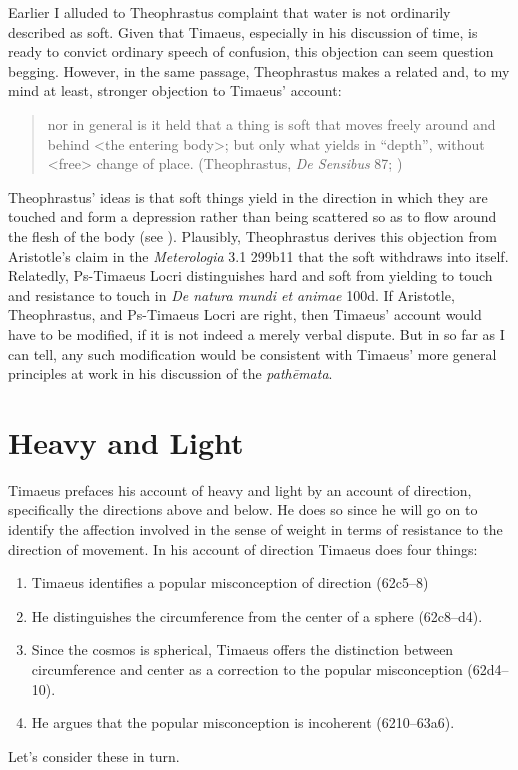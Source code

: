 Earlier I alluded to Theophrastus complaint that water is not ordinarily described as soft. Given that Timaeus, especially in his discussion of time, is ready to convict ordinary speech of confusion, this objection can seem question begging. However, in the same passage, Theophrastus makes a related and, to my mind at least, stronger objection to Timaeus' account:
\begin{quote}
	nor in general is it held that a thing is soft that moves freely around and behind <the entering body>; but only what yields in ``depth'', without <free> change of place. (Theophrastus, \emph{De Sensibus} 87; \citealt[147]{Stratton:1917vn})
\end{quote}
Theophrastus' ideas is that soft things yield in the direction in which they are touched and form a depression rather than being scattered so as to flow around the flesh of the body (see \citealt[213, n230]{Stratton:1917vn}). Plausibly, Theophrastus derives this objection from Aristotle's claim in the \emph{Meterologia} 3.1 299b11 that the soft withdraws into itself. Relatedly, Ps-Timaeus Locri distinguishes hard and soft from yielding to touch and resistance to touch in \emph{De natura mundi et animae} 100d. If Aristotle, Theophrastus, and Ps-Timaeus Locri are right, then Timaeus' account would have to be modified, if it is not indeed a merely verbal dispute. But in so far as I can tell, any such modification would be consistent with Timaeus' more general principles at work in his discussion of the \emph{pathēmata}.


\section{Heavy and Light} %
\label{sec:heavy_and_light}

Timaeus prefaces his account of heavy and light by an account of direction, specifically the directions above and below. He does so since he will go on to identify the affection involved in the sense of weight in terms of resistance to the direction of movement. In his account of direction Timaeus does four things:
\begin{enumerate}
	\item Timaeus identifies a popular misconception of direction (62c5--8)
	\item He distinguishes the circumference from the center of a sphere (62c8--d4).
	\item Since the cosmos is spherical, Timaeus offers the distinction between circumference and center as a correction to the popular misconception (62d4--10).
	\item He argues that the popular misconception is incoherent (6210--63a6).
\end{enumerate}
Let's consider these in turn.

